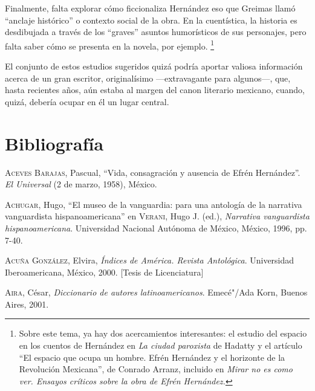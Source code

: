 \documentclass[14pt,twoside,final]{extbook} %
\let\oldfootnote\footnote
\renewcommand\footnote[1]{%
\oldfootnote{\hspace{1mm}#1}}
\begin{document}
Finalmente, falta explorar cómo ficcionaliza Hernández eso que Greimas llamó ``anclaje histórico'' o contexto social de la obra. En la cuentística, la historia es desdibujada a través de los ``graves'' asuntos humorísticos de sus personajes, pero falta saber cómo se presenta en la novela, por ejemplo.\footnote{Sobre este tema, ya hay dos acercamientos interesantes: el estudio del espacio en los cuentos de Hernández en \emph{La ciudad paroxista} de Hadatty y el artículo ``El espacio que ocupa un hombre. Efrén Hernández y el horizonte de la Revolución Mexicana'', de Conrado Arranz, incluido en \emph{Mirar no es como ver. Ensayos críticos sobre la obra de Efrén Hernández.}}

El conjunto de estos estudios sugeridos quizá podría aportar valiosa información acerca de un gran escritor, originalísimo ---extravagante para algunos---, que, hasta recientes años, aún estaba al margen del canon literario mexicano, cuando, quizá, debería ocupar en él un lugar central.
\chapter[\textsc{Bibliografía}]{Bibliografía}\label{ch:bibliografia}
\thispagestyle{empty}
\pagestyle{fancy}
\fancyhf{} %
\fancyhead[RO,LE]{\thepage}
\renewcommand{\headrulewidth}{0pt}
\setcounter{page}{141}
\textsc{Aceves Barajas}, Pascual, ``Vida, consagración y ausencia de Efrén Hernández''. \emph{El Universal} (2 de marzo, 1958), México.\label{bib:aceves1958}

\textsc{Achugar}, Hugo, ``El museo de la vanguardia: para una antología de la narrativa vanguardista hispanoamericana'' en \textsc{Verani}, Hugo J. (ed.), \emph{Narrativa vanguardista hispanoamericana}. Universidad Nacional Autónoma de México, México, 1996, pp. 7-40.\label{bib:achugar1996}

\textsc{Acuña González}, Elvira, \emph{Índices de \emph{América. Revista Antológica}}. Universidad Iberoamericana, México, 2000. [Tesis de Licenciatura]\label{bib:acuña2000}

\textsc{Aira}, César, \emph{Diccionario de autores latinoamericanos}. Emecé"/Ada Korn, Buenos Aires, 2001.\label{bib:aira2001}
\end{document}
